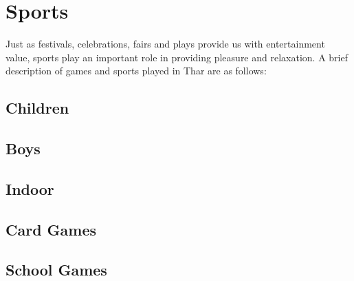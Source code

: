 \chapter{Sports}
Just as festivals, celebrations, fairs and plays provide us with entertainment value, sports play an important role in providing pleasure and relaxation. A brief description of games and sports played in Thar are as follows:

\section{Children}

\section{Boys}

\section{Indoor}

\section{Card Games}

\section{School Games}

